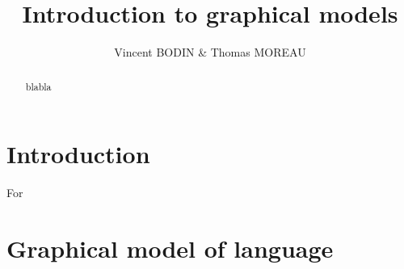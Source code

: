 \documentclass[10pt,a4paper]{article}
\title{Introduction to graphical models}
\author{Vincent BODIN \& Thomas MOREAU}
\begin{document}
\maketitle

\hrulefill
\vspace{2cm}
\begin{abstract}
blabla
\end{abstract}



\newpage
\tableofcontents
\newpage
\section*{Introduction}

For 


\section{Graphical model of language}

\cite{Kol}



\newpage



\end{document}
